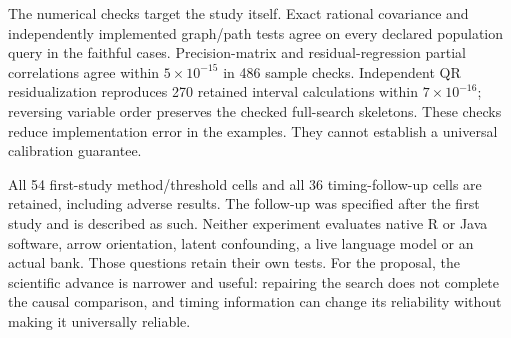 The numerical checks target the study itself. Exact rational covariance and
independently implemented graph/path tests agree on every declared population
query in the faithful cases. Precision-matrix and residual-regression partial
correlations agree within $5\times10^{-15}$ in 486 sample checks. Independent
QR residualization reproduces 270 retained interval calculations within
$7\times10^{-16}$; reversing variable order preserves the checked full-search
skeletons. These checks reduce implementation error in the examples. They
cannot establish a universal calibration guarantee.

All 54 first-study method/threshold cells and all 36 timing-follow-up cells
are retained, including adverse results. The follow-up was specified after
the first study and is described as such. Neither experiment evaluates native
R or Java software, arrow orientation, latent confounding, a live language
model or an actual bank. Those questions retain their own tests. For the
proposal, the scientific advance is narrower and useful: repairing the search
does not complete the causal comparison, and timing information can change
its reliability without making it universally reliable.
